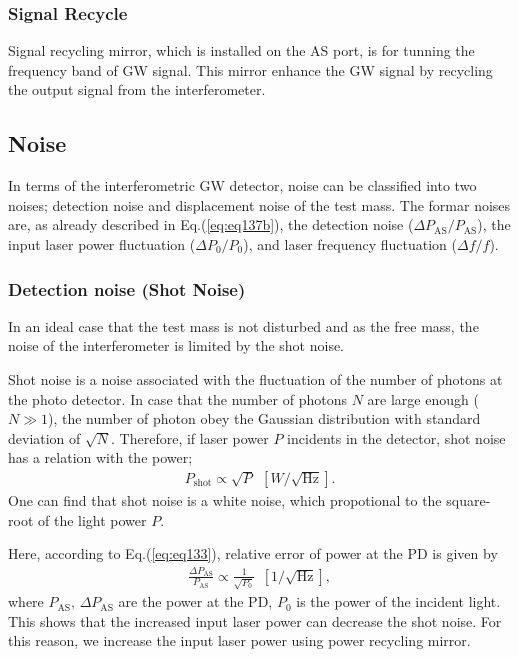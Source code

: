 \subsubsection{Signal Recycle}
Signal recycling mirror, which is installed on the AS port, is for tunning the frequency band of GW signal. This mirror enhance the GW signal by recycling the output signal from the interferometer.

\subsection{Noise}
In terms of the interferometric GW detector, noise can be classified into two noises; detection noise and displacement noise of the test mass. The formar noises are, as already described in Eq.(\ref{eq:eq137b}), the detection noise  ($\Delta{P_{\mathrm{AS}}}/P_{\mathrm{AS}}$), the input laser power fluctuation  ($\Delta{P_0}/P_0$), and laser frequency fluctuation ($\Delta{f}/f$).

\subsubsection{Detection noise (Shot Noise)}
In an ideal case that the test mass is not disturbed and as the free mass, the noise of the interferometer is limited by the shot noise.

Shot noise is a noise associated with the fluctuation of the number of photons at the photo detector. In case that the number of photons $N$ are large enough ($N\gg1$), the number of photon obey the Gaussian distribution with standard deviation of $\sqrt{N}$. Therefore, if laser power $P$ incidents in the detector, shot noise has a relation with the power;
\begin{eqnarray}
  P_{\mathrm{shot}} \propto \sqrt{P}\ \ [W/\sqrt{\mathrm{Hz}}].  \label{eq:eq136}
\end{eqnarray}
One can find that shot noise is a white noise, which propotional to the square-root of the light power $P$.

Here, according to Eq.(\ref{eq:eq133}), relative error of power at the PD is given by 
\begin{eqnarray}
  \frac{\Delta P_{\mathrm{AS}}}{P_{\mathrm{AS}}}  \propto \frac{1}{\sqrt{P_{\mathrm{0}}}}\ \ [1/\sqrt{\mathrm{Hz}}],  \label{eq:eq136}
\end{eqnarray}
where $P_{\mathrm{AS}},\,\Delta P_{\mathrm{AS}}$ are the power at the PD, $P_0$ is the power of the incident light. This shows that the increased input laser power can decrease the shot noise. For this reason, we increase the input laser power using power recycling mirror.

